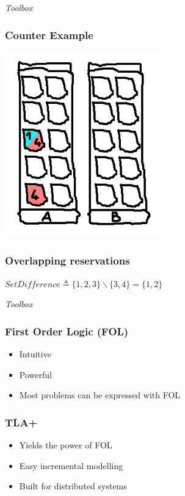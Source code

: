 \documentclass{beamer}
\begin{document}
\begin{frame}
  \centering \Huge \emph{Toolbox}
\end{frame}

\begin{frame}
  \frametitle{Counter Example}
  
  \begin{center}
    \includegraphics[width=0.5\textwidth]{tla-introduction/conflict-reservation}
  \end{center}
\end{frame}

\begin{frame}
  \frametitle{Overlapping reservations}
  
  $SetDifference \triangleq \{1, 2, 3\} \backslash \{3, 4\} = \{1, 2\}$
\end{frame}

\begin{frame}
  \centering \Huge \emph{Toolbox}
\end{frame}

\begin{frame}
  \frametitle{First Order Logic (FOL)}
  
  \begin{itemize}
  	\item Intuitive
  	\item Powerful
  	\item Most problems can be expressed with FOL
  \end{itemize}
\end{frame}

\begin{frame}
  \frametitle{TLA+}
  
  \begin{itemize}
  	\item Yields the power of FOL
  	\item Easy incremental modelling
  	\item Built for distributed systems
  \end{itemize}
\end{frame}
\end{document}

